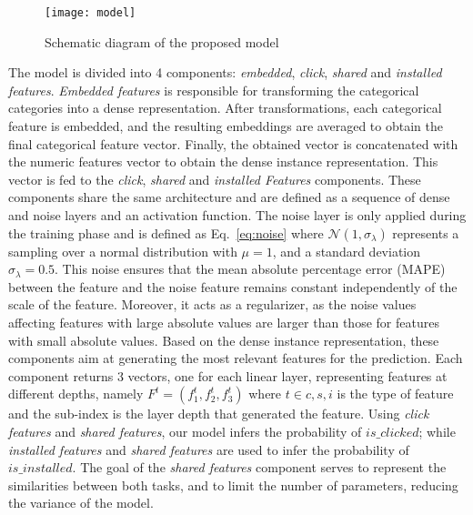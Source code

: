 \documentclass[manuscript,nonacm]{acmart}
\begin{document}
\begin{figure*}
     \centering
    \texttt{[image: model]}\vspace{-0.2cm}
    \caption{Schematic diagram of the proposed model}
    \label{fig:model}\vspace{-0.54cm}
\end{figure*}

The model is divided into 4 components: \textit{embedded}, \textit{click}, \textit{shared} and \textit{installed} \textit{features}. \textit{Embedded features} is responsible for transforming the categorical categories into a dense representation. After transformations, each categorical feature is embedded, and the resulting embeddings are averaged to obtain the final categorical feature vector. Finally, the obtained vector is concatenated with the numeric features vector to obtain the dense instance representation. This vector is fed to the \textit{click}, \textit{shared} and \textit{installed Features} components. These components share the same architecture and are defined as a sequence of dense and noise layers and an activation function. The noise layer is only applied during the training phase and is defined as Eq.~\ref{eq:noise} where $\mathcal{N}(1,\sigma_\lambda)$ represents a sampling over a normal distribution with $\mu = 1$, and a standard deviation $\sigma_\lambda = 0.5$. This noise ensures that the mean absolute percentage error (MAPE) between the feature and the noise feature remains constant independently of the scale of the feature. Moreover, it acts as a regularizer, as the noise values affecting features with large absolute values are larger than those for features with small absolute values. Based on the dense instance representation, these components aim at generating the most relevant features for the prediction. Each component returns 3 vectors, one for each linear layer, representing features at different depths, namely $F^{t}=(f^{t}_{1}, f^{t}_{2}, f^{t}_{3})$ where $t\in{c, s, i}$ is the type of feature and the sub-index is the layer depth that generated the feature. Using \textit{click features} and \textit{shared features}, our model infers the probability of $is\_clicked$; while \textit{installed features} and \textit{shared features} are used to infer the probability of $is\_installed$. The goal of the \textit{shared features} component serves to represent the similarities between both tasks, and to limit the number of parameters, reducing the variance of the model.\vspace{-0.3cm} 
\end{document}
